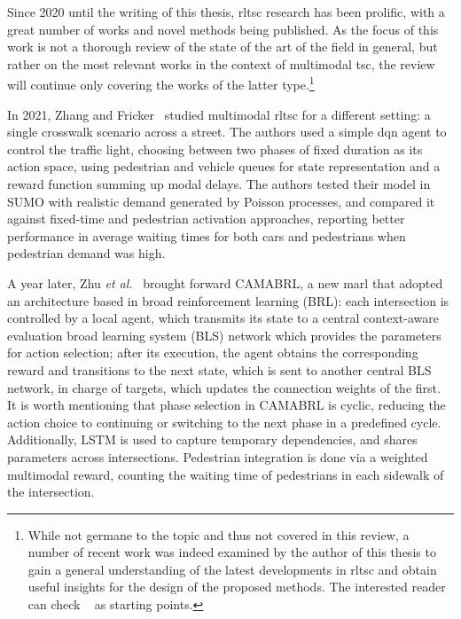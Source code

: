 \medskip

\noindent Since 2020 until the writing of this thesis, \gls{rltsc} research has been prolific, with a great number of works and novel methods being published. As the focus of this work is not a thorough review of the state of the art of the field in general, but rather on the most relevant works in the context of multimodal \gls{tsc}, the review will continue only covering the works of the latter type.\footnote{While not germane to the topic and thus not covered in this review, a number of recent work was indeed examined by the author of this thesis to gain a general understanding of the latest developments in \gls{rltsc} and obtain useful insights for the design of the proposed methods. The interested reader can check ~\cite{Guo2023,Lee2023,Yu2023,Da2024,Du2024,Huang2024,Cai2025,Du2025,Elharoun2025,Faqir2025,Fan2025,Jia2025,Liu2025,Liu2025b,Liu2025d,Liu2025e,Nie2025,Othman2025,Shang2025,Wang2025b,Yuan2025,Zhang2025c,Zhu2025,Huang2026,Wang2026} as starting points.}

\medskip

\noindent In 2021, Zhang and Fricker~\cite{Zhang2021c} studied multimodal \gls{rltsc} for a different setting: a single crosswalk scenario across a street. The authors used a simple \gls{dqn} agent to control the traffic light, choosing between two phases of fixed duration as its action space, using pedestrian and vehicle queues for state representation and a reward function summing up modal delays. The authors tested their model in SUMO with realistic demand generated by Poisson processes, and compared it against fixed-time and pedestrian activation approaches, reporting better performance in average waiting times for both cars and pedestrians when pedestrian demand was high.

A year later, Zhu \textit{et al.}~\cite{Zhu2022} brought forward CAMABRL, a new \gls{marl} that adopted an architecture based in broad reinforcement learning (BRL): each intersection is controlled by a local agent, which transmits its state to a central context-aware evaluation broad learning system (BLS) network which provides the parameters for action selection; after its execution, the agent obtains the corresponding reward and transitions to the next state, which is sent to another central BLS network, in charge of targets, which updates the connection weights of the first. It is worth mentioning that phase selection in CAMABRL is cyclic, reducing the action choice to continuing or switching to the next phase in a predefined cycle. Additionally, LSTM is used to capture temporary dependencies, and shares parameters across intersections. Pedestrian integration is done via a weighted multimodal reward, counting the waiting time of pedestrians in each sidewalk of the intersection.


